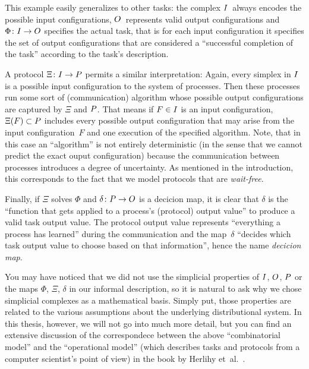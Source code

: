 This example easily generalizes to other tasks:
the complex $I$~always encodes the possible input configurations,
$O$~represents valid output configurations and $\Phi\colon I\to O$
specifies the actual task, that is for each input configuration it
specifies the set of output configurations that are considered a
\enquote{successful completion of the task} according to the task's
description.

A protocol $\Xi\colon I\to P$ permits a similar interpretation:
Again, every simplex in $I$ is a possible input configuration to
the system of processes. Then these processes run some sort of
(communication) algorithm whose possible output configurations are
captured by $\Xi$ and $P$. That means if $F\in I$ is an input
configuration, $\Xi(F) \subset P$ includes every possible output
configuration that may arise from the input configuration~$F$ and
one execution of the specified algorithm. Note, that in this case
an \enquote{algorithm} is not entirely deterministic (in the sense
that we cannot predict the exact ouput configuration) because the
communication between processes introduces a degree of uncertainty.
As mentioned %
in the introduction, this corresponds to the fact that we model
protocols that are \emph{wait-free}.

Finally, if $\Xi$ solves $\Phi$ and $\delta\colon P\to O$ is a decicion
map, it is clear that $\delta$ is the \enquote{function that gets applied
to a process's (protocol) output value} to produce a valid task
output value. The protocol output value represents \enquote{everything
a process has learned} during the communication and the map~$\delta$
\enquote{decides which task output value to choose based on that
information}, hence the name \emph{decicion map}.

You may have noticed that we did not use the simplicial properties of
$I$, $O$, $P$ or the maps $\Phi$, $\Xi$, $\delta$ in our
informal description, so it is natural to ask why we chose simplicial
complexes as a mathematical basis. Simply put, those properties are
related to the various assumptions about the underlying distributional
system. In this thesis, however, we will not go into much more detail,
but you can find an extensive discussion of the correspondece between
the above \enquote{combinatorial model} and the \enquote{operational
model} (which describes tasks and protocols from a computer
scientist's point of view) in the book by
Herlihy et~al.~\cite[Ch.\,4]{bookc:herlihyetal13}.

